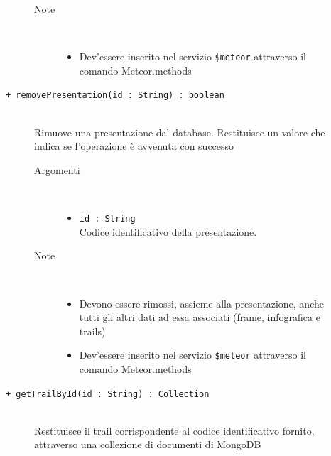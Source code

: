 \begin{description}
\begin{description}
\begin{description}
\begin{itemize}
				\end{itemize}
			\item[Note] \hfill \\
			\begin{itemize}
					\item Dev'essere inserito nel servizio \texttt{\$meteor} attraverso il comando Meteor.methods
				\end{itemize}
		\end{description}
	\end{description}
	
	\begin{description}
		\item[\texttt{+ removePresentation(id : String) : boolean			}] \hfill \\
			Rimuove una presentazione dal database. Restituisce un valore che indica se l'operazione è avvenuta con successo
			
		\begin{description}
			\item[Argomenti] \hfill \\
				\begin{itemize}
				
					\item \texttt{id : String			} \hfill \\
					Codice identificativo della presentazione.
					
				\end{itemize}
			\item[Note] \hfill \\
			\begin{itemize}
					\item Devono essere rimossi, assieme alla presentazione, anche tutti gli altri dati ad essa associati (frame, infografica e trails)
					\item Dev'essere inserito nel servizio \texttt{\$meteor} attraverso il comando Meteor.methods
				\end{itemize}
		\end{description}
	\end{description}
	
	\begin{description}
		\item[\texttt{+ getTrailById(id : String) : Collection			}] \hfill \\
			Restituisce il trail corrispondente al codice identificativo fornito, attraverso una collezione di documenti di MongoDB
			

\end{description}
\end{description}
